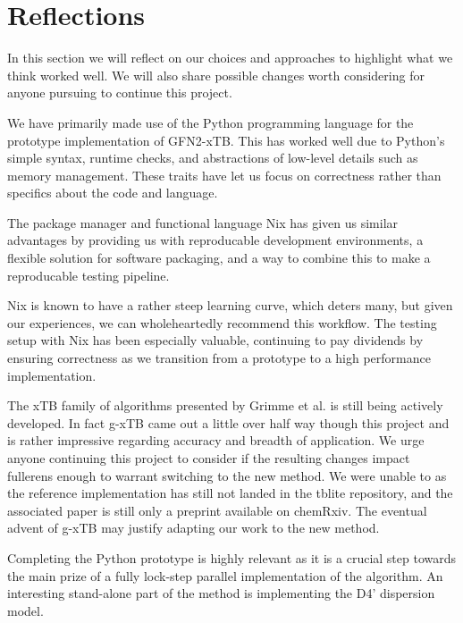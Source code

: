 \chapter{Reflections}\label{sec:reflection}
In this section we will reflect on our choices and approaches to highlight what we think worked well. We will also share possible changes worth considering for anyone pursuing to continue this project.%

We have primarily made use of the Python programming language for the prototype implementation of GFN2-xTB. This has worked well due to Python's simple syntax, runtime checks, and abstractions of low-level details such as memory management. These traits have let us focus on correctness rather than specifics about the code and language.

The package manager and functional language Nix has given us similar advantages by providing us with reproducable development environments, a flexible solution for software packaging, and a way to combine this to make a reproducable testing pipeline. %

Nix is known to have a rather steep learning curve, which deters many, but given our experiences, we can wholeheartedly recommend this workflow. The testing setup with Nix has been especially valuable, continuing to pay dividends by ensuring correctness as we transition from a prototype to a high performance implementation.

The xTB family of algorithms presented by Grimme et al. is still being actively developed. In fact g-xTB came out a little over half way though this project and is rather impressive regarding accuracy and breadth of application. We urge anyone continuing this project to consider if the resulting changes impact fullerens enough to warrant switching to the new method. We were unable to as the reference implementation has still not landed in the tblite repository, and the associated paper is still only a preprint available on chemRxiv\cite{g-xtb}. 
The eventual advent of g-xTB may justify adapting our work to the new method. 

Completing the Python prototype is highly relevant as it is a crucial step towards the main prize of a fully lock-step parallel implementation of the algorithm. 
An interesting stand-alone part of the method is implementing the D4' dispersion model. 

